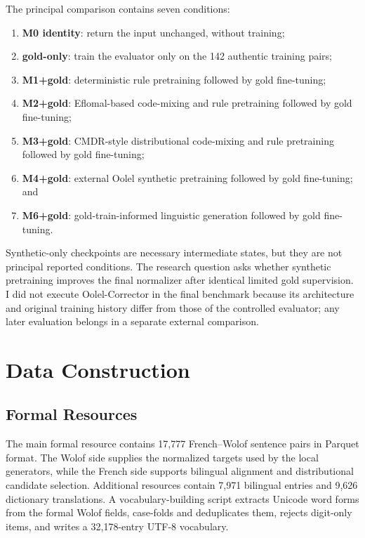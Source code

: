 \documentclass[12pt, a4paper, twoside, openany]{report}
\begin{document}
The principal comparison contains seven conditions:

\begin{enumerate}
	\item \textbf{M0 identity}: return the input unchanged, without training;
	\item \textbf{gold-only}: train the evaluator only on the 142 authentic training pairs;
	\item \textbf{M1+gold}: deterministic rule pretraining followed by gold fine-tuning;
	\item \textbf{M2+gold}: Eflomal-based code-mixing and rule pretraining followed by gold fine-tuning;
	\item \textbf{M3+gold}: CMDR-style distributional code-mixing and rule pretraining followed by gold fine-tuning;
	\item \textbf{M4+gold}: external Oolel synthetic pretraining followed by gold fine-tuning; and
	\item \textbf{M6+gold}: gold-train-informed linguistic generation followed by gold fine-tuning.
\end{enumerate}

Synthetic-only checkpoints are necessary intermediate states, but they are not principal reported conditions. The research question asks whether synthetic pretraining improves the final normalizer after identical limited gold supervision. I did not execute Oolel-Corrector in the final benchmark because its architecture and original training history differ from those of the controlled evaluator; any later evaluation belongs in a separate external comparison.


\section{Data Construction}

\subsection{Formal Resources}

The main formal resource contains 17,777 French--Wolof sentence pairs in Parquet format. The Wolof side supplies the normalized targets used by the local generators, while the French side supports bilingual alignment and distributional candidate selection. Additional resources contain 7,971 bilingual entries and 9,626 dictionary translations. A vocabulary-building script extracts Unicode word forms from the formal Wolof fields, case-folds and deduplicates them, rejects digit-only items, and writes a 32,178-entry UTF-8 vocabulary.
\end{document}
